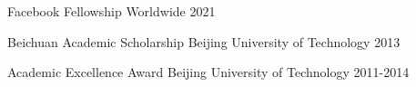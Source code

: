 

\begin{cvhonors}

  \cvhonor
  	{Facebook Fellowship}
  	{}
  	{Worldwide}
  	{2021}

  \cvhonor
	{Beichuan Academic Scholarship}
	{}
	{Beijing University of Technology}
	{2013} 
  
  \cvhonor
 	{Academic Excellence Award}
 	{}
 	{Beijing University of Technology}
 	{2011-2014} 
  
 
  	
  	

\end{cvhonors}
